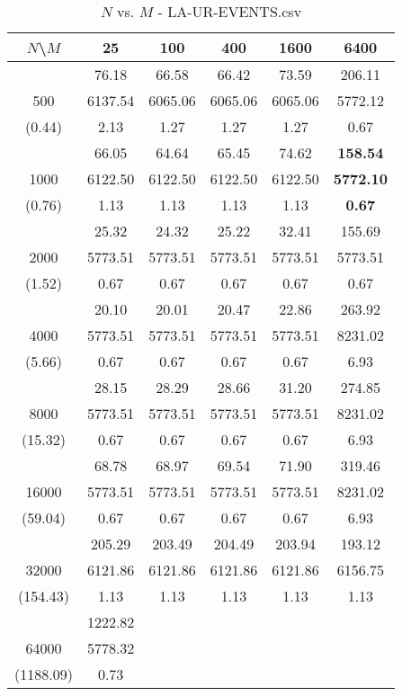 \documentclass[conference]{IEEEtran}
\begin{document}
\begin{table}[th]
\caption{$N$ vs. $M$ - LA-UR-EVENTS.csv}
\label{tab:LA-UR-06-0803-MX20_NODES_0_TO_255_EVENTS.csv}
\centering
\begin{tabular}{|c||c|c|c|c|c|}
\hline
$N$\textbackslash $M$ & 25 & 100 & 400 & 1600 & 6400 \\ \hline \hline
  & 76.18 & 66.58 & 66.42 & 73.59 & 206.11\\ 
500  & 6137.54 & 6065.06 & 6065.06 & 6065.06 & 5772.12\\ 
(0.44)  & 2.13 & 1.27 & 1.27 & 1.27 & 0.67\\ \hline 
  & 66.05 & 64.64 & 65.45 & 74.62 & {\bf 158.54}\\ 
1000  & 6122.50 & 6122.50 & 6122.50 & 6122.50 & {\bf 5772.10}\\ 
(0.76)  & 1.13 & 1.13 & 1.13 & 1.13 & {\bf 0.67}\\ \hline 
  & 25.32 & 24.32 & 25.22 & 32.41 & 155.69\\ 
2000  & 5773.51 & 5773.51 & 5773.51 & 5773.51 & 5773.51\\ 
(1.52)  & 0.67 & 0.67 & 0.67 & 0.67 & 0.67\\ \hline 
  & 20.10 & 20.01 & 20.47 & 22.86 & 263.92\\ 
4000  & 5773.51 & 5773.51 & 5773.51 & 5773.51 & 8231.02\\ 
(5.66)  & 0.67 & 0.67 & 0.67 & 0.67 & 6.93\\ \hline 
  & 28.15 & 28.29 & 28.66 & 31.20 & 274.85\\ 
8000  & 5773.51 & 5773.51 & 5773.51 & 5773.51 & 8231.02\\ 
(15.32)  & 0.67 & 0.67 & 0.67 & 0.67 & 6.93\\ \hline 
  & 68.78 & 68.97 & 69.54 & 71.90 & 319.46\\ 
16000  & 5773.51 & 5773.51 & 5773.51 & 5773.51 & 8231.02\\ 
(59.04)  & 0.67 & 0.67 & 0.67 & 0.67 & 6.93\\ \hline 
  & 205.29 & 203.49 & 204.49 & 203.94 & 193.12\\ 
32000  & 6121.86 & 6121.86 & 6121.86 & 6121.86 & 6156.75\\ 
(154.43)  & 1.13 & 1.13 & 1.13 & 1.13 & 1.13\\ \hline 
  & 1222.82 &  &  &  & \\ 
64000  & 5778.32 &  &  &  & \\ 
(1188.09)  & 0.73 &  &  &  & \\ \hline 
\end{tabular}
\end{table}
\end{document}
